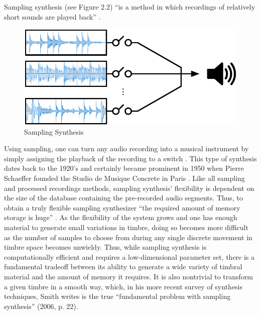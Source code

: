 \documentclass[12pt]{report} 	%
\numberwithin{figure}{chapter}
\numberwithin{table}{chapter}
\numberwithin{equation}{chapter}
\begin{document}
\begin{flushleft}
Sampling synthesis (see Figure 2.2) ``is a method in which recordings of relatively short sounds are played back'' \cite[p. 10]{Tolonen:1998bh}. 
\begin{figure}[h!]
\begin{center}
\includegraphics[scale=0.8]{SamplingSynthesis}
\caption[Sampling synthesis]{Sampling Synthesis}
\end{center}
\end{figure}
Using sampling, one can turn any audio recording into a musical instrument by simply assigning the playback of the recording to a switch \cite[p. 1]{Heise:2009sp}. This type of synthesis dates back to the 1920's and certainly became prominent in 1950 when Pierre Schaeffer founded the Studio de Musique Concrete in Paris \cite[p. 3]{Tolonen:1998bh}. Like all sampling and processed recordings methods, sampling synthesis' flexibility is dependent on the size of the database containing the pre-recorded audio segments. Thus, to obtain a truly flexible sampling synthesizer ``the required amount of memory storage is huge'' \cite[p. 11]{Tolonen:1998bh}. As the flexibility of the system grows and one has enough material to generate small variations in timbre, doing so becomes more difficult as the number of samples to choose from during any single discrete movement in timbre space becomes unwieldy. Thus, while sampling synthesis is computationally efficient and requires a low-dimensional parameter set, there is a fundamental tradeoff between its ability to generate a wide variety of timbral material and the amount of memory it requires. It is also nontrivial to transform a given timbre in a smooth way, which, in his more recent survey of synthesis techniques, Smith writes is the true ``fundamental problem with sampling synthesis'' (2006, p. 22).


\end{flushleft}
\end{document}
